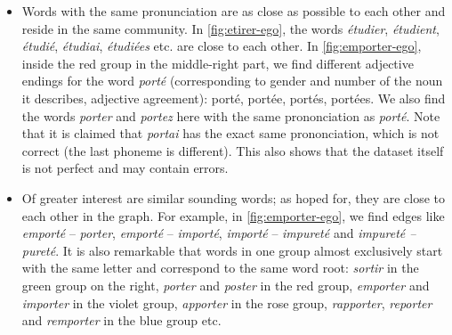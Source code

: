\begin{itemize}[leftmargin=0cm]
    \item Words with the same pronunciation are as close as possible to each other and reside in the same community. In \autoref{fig:etirer-ego}, the words \textit{étudier}, \textit{étudient}, \textit{étudié}, \textit{étudiai}, \textit{étudiées} etc. are close to each other. In \autoref{fig:emporter-ego}, inside the red group in the middle-right part, we find different adjective endings for the word \textit{porté} (corresponding to gender and number of the noun it describes, \ie adjective agreement): porté, portée, portés, portées. We also find the words \textit{porter} and \textit{portez} here with the same prononciation as \textit{porté}. Note that it is claimed that \textit{portai} has the exact same prononciation, which is not correct (the last phoneme is different). This also shows that the dataset itself is not perfect and may contain errors. 
    
    \item Of greater interest are similar sounding words; as hoped for, they are close to each other in the graph. For example, in \autoref{fig:emporter-ego}, we find edges like \textit{emporté} -- \textit{porter}, \textit{emporté} -- \textit{importé}, \textit{importé} -- \textit{impureté} and \textit{impureté -- pureté}. It is also remarkable that words in one group almost exclusively start with the same letter and correspond to the same word root: \textit{sortir} in the green group on the right, \textit{porter} and \textit{poster} in the red group, \textit{emporter} and \textit{importer} in the violet group, \textit{apporter} in the rose group, \textit{rapporter}, \textit{reporter} and \textit{remporter} in the blue group etc.
    

\end{itemize}
